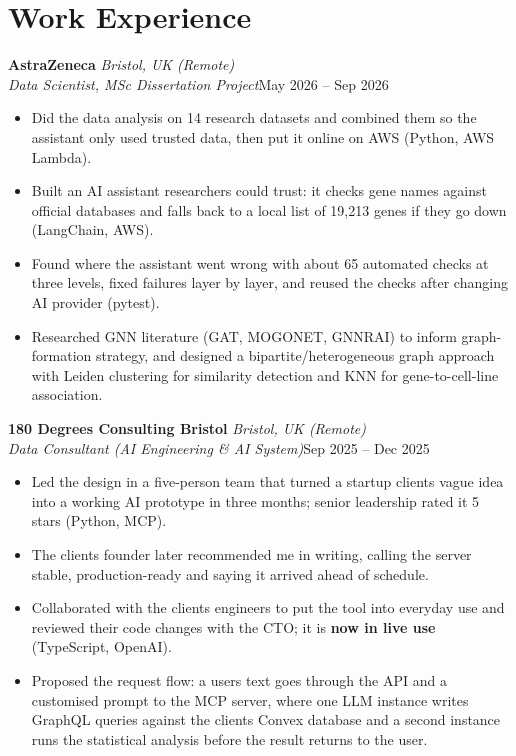 \documentclass[a4paper,11pt]{article}
\newcommand{\role}[4]{%
  \textbf{#1}{\color{muted}\,\textperiodcentered\,\textit{#2}}\\
  \textit{#4}\hfill{\color{muted}#3}\par}
\newcommand{\gap}{\vspace{5pt}}
\newcommand{\num}[1]{\textbf{#1}}   %
\begin{document}
\section{Work Experience}
\role{AstraZeneca}{Bristol, UK (Remote)}{May 2026 – Sep 2026}{Data Scientist, MSc Dissertation Project}
\begin{itemize}
  \item Did the data analysis on 14 research datasets and combined them so the assistant only used trusted data, then put it online on AWS (Python, AWS Lambda).
  \item Built an AI assistant researchers could trust: it checks gene names against official databases and falls back to a local list of 19,213 genes if they go down (LangChain, AWS).
  \item Found where the assistant went wrong with about 65 automated checks at three levels, fixed failures layer by layer, and reused the checks after changing AI provider (pytest).
  \item Researched GNN literature (GAT, MOGONET, GNNRAI) to inform graph-formation strategy, and designed a bipartite/heterogeneous graph approach with Leiden clustering for similarity detection and KNN for gene-to-cell-line association.
\end{itemize}
\gap
{}
\role{180 Degrees Consulting Bristol}{Bristol, UK (Remote)}{Sep 2025 – Dec 2025}{Data Consultant (AI Engineering \& AI System)}
\begin{itemize}
  \item Led the design in a five-person team that turned a startup client\textquotesingle{}s vague idea into a working AI prototype in three months; senior leadership rated it 5 stars (Python, MCP).
  \item The client\textquotesingle{}s founder later recommended me in writing, calling the server \textquotesingle{}stable, production-ready\textquotesingle{} and saying it arrived ahead of schedule.
  \item Collaborated with the client\textquotesingle{}s engineers to put the tool into everyday use and reviewed their code changes with the CTO; it is \num{now in live use} (TypeScript, OpenAI).
  \item Proposed the request flow: a user\textquotesingle{}s text goes through the API and a customised prompt to the MCP server, where one LLM instance writes GraphQL queries against the client\textquotesingle{}s Convex database and a second instance runs the statistical analysis before the result returns to the user.
\end{itemize}
\end{document}
